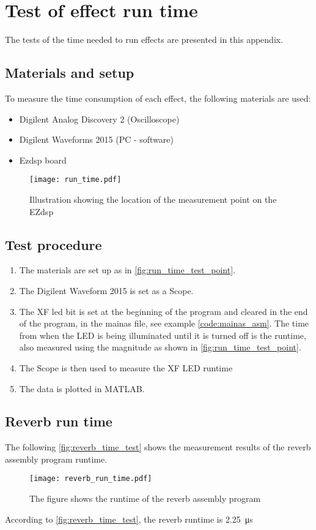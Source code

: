 \chapter{Test of effect run time}\label{app:effect_run_time}

The tests of the time needed to run effects are presented in this appendix.

\section*{Materials and setup}
To measure the time consumption of each effect, the following materials are used:
\begin{itemize}
\item Digilent Analog Discovery 2 (Oscilloscope)
\item Digilent Waveforms 2015 (PC - software)
\item Ezdsp board
\end{itemize}


\begin{figure}[htbp!]
	\centering
		\texttt{[image: run\_time.pdf]}
		\caption{Illustration showing the location of the measurement point on the EZdsp}
		\label{fig:run_time_test_point}
\end{figure}


\section*{Test procedure}
\begin{enumerate}
\item The materials are set up as in \autoref{fig:run_time_test_point}.
\item The Digilent Waveform 2015 is set as a Scope.
\item  The XF led bit is set at the beginning of the program and cleared in the end of the program, in the mainas file, see example \autoref{code:mainas_asm}. The time from when the LED is being illuminated until it is turned off is the runtime, also measured using the magnitude as shown in \autoref{fig:run_time_test_point}. 
\item  The Scope is then used to measure the XF LED runtime 
\item The data is plotted in MATLAB.
\end{enumerate}

\section*{Reverb run time}
The following \autoref{fig:reverb_time_test} shows the measurement results of the \gls{reverb} assembly program runtime.
\begin{figure}[htbp!]
	\centering
		\texttt{[image: reverb\_run\_time.pdf]}
		\caption{The figure shows the runtime of the \gls{reverb} assembly program}
		\label{fig:reverb_time_test}
\end{figure}

According to \autoref{fig:reverb_time_test}, the \gls{reverb} runtime is \SI{2.25}{\micro\second}
